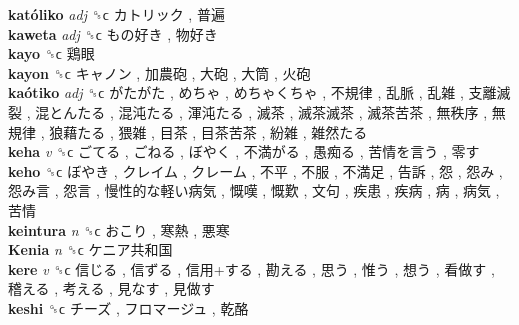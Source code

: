 \textbf{katóliko} \emph{adj}  ␝ϲ   カトリック ,  普遍   \\
\textbf{kaweta} \emph{adj}  ␝ϲ   もの好き ,  物好き   \\
\textbf{kayo} ␝ϲ   鶏眼   \\
\textbf{kayon} ␝ϲ   キャノン ,  加農砲 ,  大砲 ,  大筒 ,  火砲   \\
\textbf{kaótiko} \emph{adj}  ␝ϲ   がたがた ,  めちゃ ,  めちゃくちゃ ,  不規律 ,  乱脈 ,  乱雑 ,  支離滅裂 ,  混とんたる ,  混沌たる ,  渾沌たる ,  滅茶 ,  滅茶滅茶 ,  滅茶苦茶 ,  無秩序 ,  無規律 ,  狼藉たる ,  猥雑 ,  目茶 ,  目茶苦茶 ,  紛雑 ,  雑然たる   \\
\textbf{keha} \emph{v}  ␝ϲ   ごてる ,  ごねる ,  ぼやく ,  不満がる ,  愚痴る ,  苦情を言う ,  零す   \\
\textbf{keho} ␝ϲ   ぼやき ,  クレイム ,  クレーム ,  不平 ,  不服 ,  不満足 ,  告訴 ,  怨 ,  怨み ,  怨み言 ,  怨言 ,  慢性的な軽い病気 ,  慨嘆 ,  慨歎 ,  文句 ,  疾患 ,  疾病 ,  病 ,  病気 ,  苦情   \\
\textbf{keintura} \emph{n}  ␝ϲ   おこり ,  寒熱 ,  悪寒   \\
\textbf{Kenia} \emph{n}  ␝ϲ   ケニア共和国   \\
\textbf{kere} \emph{v}  ␝ϲ   信じる ,  信ずる ,  信用+する ,  勘える ,  思う ,  惟う ,  想う ,  看做す ,  稽える ,  考える ,  見なす ,  見做す   \\
\textbf{keshi} ␝ϲ   チーズ ,  フロマージュ ,  乾酪   \\
